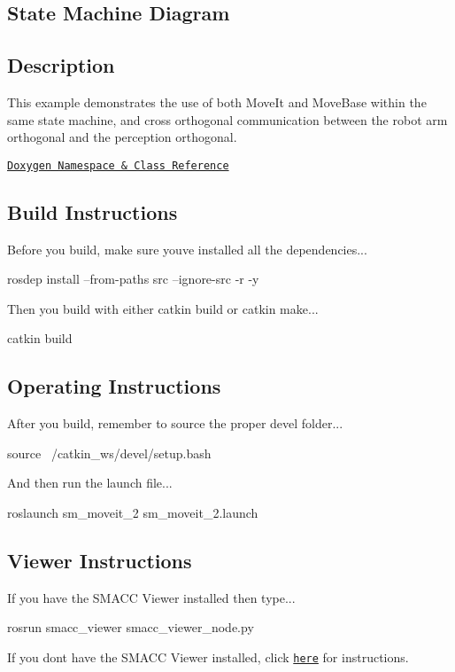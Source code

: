\subsection*{State Machine Diagram}



\subsection*{Description}

This example demonstrates the use of both Move\+It and Move\+Base within the same state machine, and cross orthogonal communication between the robot arm orthogonal and the perception orthogonal.~\newline


\href{https://reelrbtx.github.io/SMACC_Documentation/master/html/namespacesm__moveit.html}{\tt Doxygen Namespace \& Class Reference}

\subsection*{Build Instructions}

Before you build, make sure you\textquotesingle{}ve installed all the dependencies...


\begin{DoxyCode}
rosdep install --from-paths src --ignore-src -r -y 
\end{DoxyCode}


Then you build with either catkin build or catkin make...


\begin{DoxyCode}
catkin build
\end{DoxyCode}


\subsection*{Operating Instructions}

After you build, remember to source the proper devel folder...


\begin{DoxyCode}
source ~/catkin\_ws/devel/setup.bash
\end{DoxyCode}


And then run the launch file...


\begin{DoxyCode}
roslaunch sm\_moveit\_2 sm\_moveit\_2.launch
\end{DoxyCode}


\subsection*{Viewer Instructions}

If you have the S\+M\+A\+CC Viewer installed then type...


\begin{DoxyCode}
rosrun smacc\_viewer smacc\_viewer\_node.py
\end{DoxyCode}


If you don\textquotesingle{}t have the S\+M\+A\+CC Viewer installed, click \href{http://smacc.ninja/smacc-viewer/}{\tt here} for instructions. 